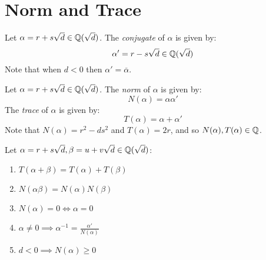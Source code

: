 \documentclass[letterpaper,12pt,fleqn]{article}
\newcommand{\sd}{\sqrt{d}}
\newcommand{\Qd}{\Q(\sd)}
\renewcommand{\a}{\alpha}
\renewcommand{\b}{\beta}
\begin{document}
\section*{Norm and Trace}

\begin{definition}[Conjugate]
  Let $\a=r+s\sd\in\Qd$. The \emph{conjugate} of $\a$ is given by:
  \[\a'=r-s\sd\in\Qd\]
  Note that when $d<0$ then $\a'=\overline{\a}$.
\end{definition}

\begin{definition}
  Let $\a=r+s\sd\in\Qd$. The \emph{norm} of $\a$ is given by:
  \[N(\a)=\a\a'\]
  The \emph{trace} of $\a$ is given by:
  \[T(\a)=\a+\a'\]
  Note that $N(\a)=r^2-ds^2$ and $T(\a)=2r$, and so $N(\a),T(\a)\in\Q$.
\end{definition}

\begin{properties}
  Let $\a=r+s\sd,\b=u+v\sd\in\Qd$:
  \begin{enumerate}
  \item $T(\a+\b)=T(\a)+T(\b)$
  \item $N(\a\b)=N(\a)N(\b)$
  \item $N(\a)=0\iff\a=0$
  \item $\a\ne0\implies\a^{-1}=\frac{\a'}{N(\a)}$
  \item $d<0\implies N(\a)\ge 0$
  \end{enumerate}
\end{properties}
\end{document}

